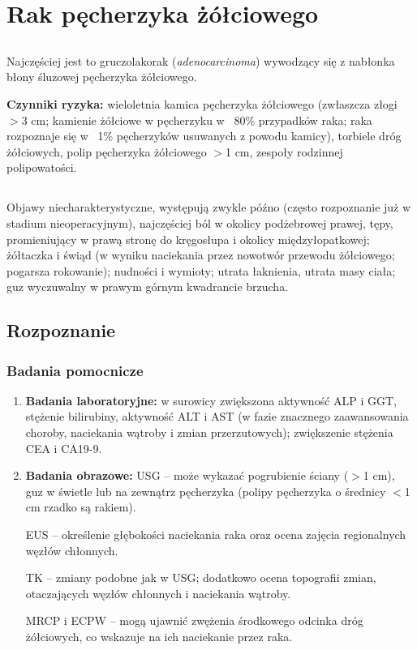 
\chapter{Rak pęcherzyka żółciowego}

\section{\DiEtp}

Najczęściej jest to gruczolakorak (\textit{adenocarcinoma}) wywodzący się z nabłonka błony śluzowej pęcherzyka żółciowego.

\textbf{Czynniki ryzyka:} wieloletnia kamica pęcherzyka żółciowego (zwłaszcza złogi $>$3 cm; kamienie żółciowe w pęcherzyku w ~80\% przypadków raka; raka rozpoznaje się w ~1\% pęcherzyków usuwanych z powodu kamicy), torbiele dróg żółciowych, polip pęcherzyka żółciowego $>$1 cm, zespoły rodzinnej polipowatości. 

\section{\ObriP}

Objawy niecharakterystyczne, występują zwykle późno (często rozpoznanie już w stadium nieoperacyjnym), najczęściej ból w okolicy podżebrowej prawej, tępy, promieniujący w prawą stronę do kręgosłupa i okolicy międzyłopatkowej; żółtaczka i świąd (w wyniku naciekania przez nowotwór przewodu żółciowego; pogarsza rokowanie); nudności i wymioty; utrata łaknienia, utrata masy ciała; guz wyczuwalny w prawym górnym kwadrancie brzucha.

\section{Rozpoznanie}

\subsection{Badania pomocnicze}

\begin{enumerate}
    \item \textbf{Badania laboratoryjne:} w surowicy zwiększona aktywność ALP i GGT, stężenie bilirubiny, aktywność ALT i AST (w fazie znacznego zaawansowania choroby, naciekania wątroby i zmian przerzutowych); zwiększenie stężenia CEA i CA19-9.

    \item \textbf{Badania obrazowe:} USG – może wykazać pogrubienie ściany ($>$1 cm), guz w świetle lub na zewnątrz pęcherzyka (polipy pęcherzyka o średnicy $<$1 cm rzadko są rakiem). 
    
    EUS – określenie głębokości naciekania raka oraz ocena zajęcia regionalnych węzłów chłonnych. 
    
    TK – zmiany podobne jak w USG; dodatkowo ocena topografii zmian, otaczających węzłów chłonnych i naciekania wątroby. 
    
    MRCP i ECPW – mogą ujawnić zwężenia środkowego odcinka dróg żółciowych, co wskazuje na ich naciekanie przez raka.
\end{enumerate}

